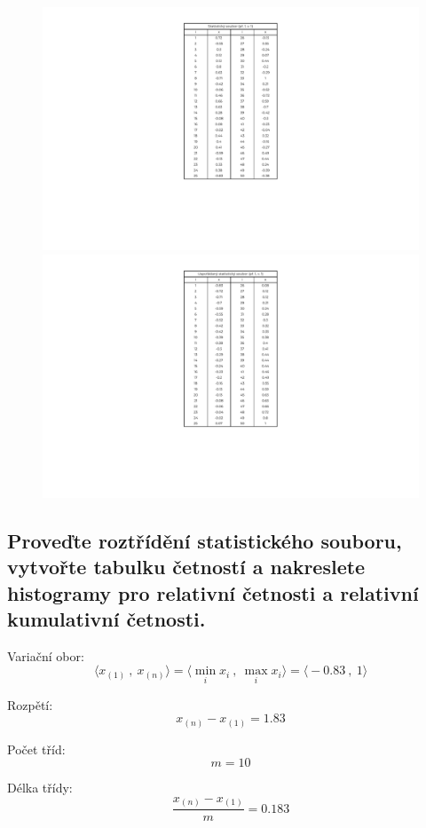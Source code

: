 \begin{figure}[H]
    \centering
    \includegraphics[width=.49\linewidth]{1-1-crop.pdf}
    \hfill
    \includegraphics[width=.49\linewidth]{1-2-crop.pdf}
\end{figure}


\subsection{Proveďte roztřídění statistického souboru, vytvořte tabulku četností a nakreslete histogramy pro relativní četnosti a relativní kumulativní četnosti.}

\begin{compactitem}
    \item Variační obor:
    $${\displaystyle \big\langle x_{(1)} ~,~ x_{(n)} \big\rangle = \big\langle \min_{i} x_i ~,~ \max_{i} x_i \big\rangle = \big\langle -0.83 ~,~ 1 \big\rangle}$$

    \item Rozpětí:
    $${\displaystyle x_{(n)} - x_{(1)} = 1.83}$$

    \item Počet tříd:
    $${\displaystyle m = 10}$$

    \item Délka třídy:
    $${\displaystyle \frac{x_{(n)} - x_{(1)}}{m} = 0.183}$$
\end{compactitem}

